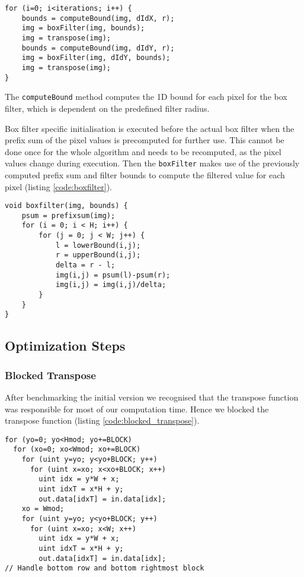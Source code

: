 \begin{lstlisting}[caption=Filterstep,label=code:filterstep]
for (i=0; i<iterations; i++) {
    bounds = computeBound(img, dIdX, r);
    img = boxFilter(img, bounds);
    img = transpose(img);
    bounds = computeBound(img, dIdY, r);
    img = boxFilter(img, dIdY, bounds);
    img = transpose(img);
}
\end{lstlisting}

The \lstinline{computeBound} method computes the 1D bound for each pixel for the box filter, which is dependent on the predefined filter radius. 

Box filter specific initialisation is executed before the actual box filter when the prefix sum of the pixel values is precomputed for further use. This cannot be done once for the whole algorithm and needs to be recomputed, as the pixel values change during execution. Then the \lstinline{boxFilter} makes use of the previously computed prefix sum and filter bounds to compute the filtered value for each pixel (listing \ref{code:boxfilter}).

\begin{lstlisting}[caption=Boxfilter step, label=code:boxfilter]
void boxfilter(img, bounds) {
    psum = prefixsum(img);
    for (i = 0; i < H; i++) {
        for (j = 0; j < W; j++) {
            l = lowerBound(i,j);
            r = upperBound(i,j);
            delta = r - l;
            img(i,j) = psum(l)-psum(r);
            img(i,j) = img(i,j)/delta;
        }
    }
}
\end{lstlisting}

\subsection{Optimization Steps}

\subsubsection{Blocked Transpose}

After benchmarking the initial version we recognised that the transpose function was responsible for most of our computation time. Hence we blocked the transpose function (listing \ref{code:blocked_transpose}).

\begin{lstlisting}[caption=Transpose block, label=code:blocked_transpose]
for (yo=0; yo<Hmod; yo+=BLOCK)
  for (xo=0; xo<Wmod; xo+=BLOCK)
    for (uint y=yo; y<yo+BLOCK; y++)
      for (uint x=xo; x<xo+BLOCK; x++)
        uint idx = y*W + x;
        uint idxT = x*H + y;
        out.data[idxT] = in.data[idx];
    xo = Wmod;
    for (uint y=yo; y<yo+BLOCK; y++)
      for (uint x=xo; x<W; x++)
        uint idx = y*W + x;
        uint idxT = x*H + y;
        out.data[idxT] = in.data[idx];
// Handle bottom row and bottom rightmost block
\end{lstlisting}

